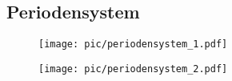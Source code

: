 \begin{appendices}
        \clearpage
        \chapter{Periodensystem}
        
        \begin{figure}
                \centering
                \texttt{[image: pic/periodensystem\_1.pdf]}
                \label{fig:persys}
        \end{figure}        

        \begin{figure}
                \centering
                \texttt{[image: pic/periodensystem\_2.pdf]}
        \end{figure}

\end{appendices}